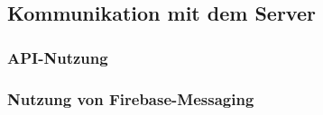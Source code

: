 \subsection{Kommunikation mit dem Server}
\subsubsection{API-Nutzung}
\subsubsection{Nutzung von Firebase-Messaging}